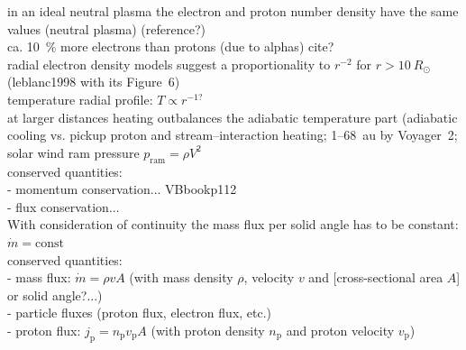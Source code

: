 	in an ideal neutral plasma the electron and proton number density have the same values (neutral plasma) (reference?)\\
	ca. 10~\% more electrons than protons (due to alphas) cite?\\	%
	radial electron density models suggest a proportionality to $r^{-2}$ for $r > 10~R_\odot$ (leblanc1998 with its Figure~6)\\
temperature radial profile: $T \propto r^{-1?}$\\
	at larger distances heating outbalances the adiabatic temperature part (adiabatic cooling vs. pickup proton and stream--interaction heating; 1--68~au by Voyager~2; \citet{Richardson2003}\\


solar wind ram pressure $p_\text{ram} = \rho V^2$\\

conserved quantities:\\
- momentum conservation... VBbookp112\\
- flux conservation...\\



With consideration of continuity the mass flux per solid angle has to be constant: $\dot{m} = \text{const}$\\
conserved quantities:\\
- mass flux: $\dot{m} = \rho v A$ (with mass density $\rho$, velocity $v$ and [cross-sectional area $A$] or solid angle?...)\\
- particle fluxes (proton flux, electron flux, etc.)\\
	- proton flux: $j_\text{p} = n_\text{p} v_\text{p} A$ (with proton density $n_\text{p}$ and proton velocity $v_\text{p}$)\\

